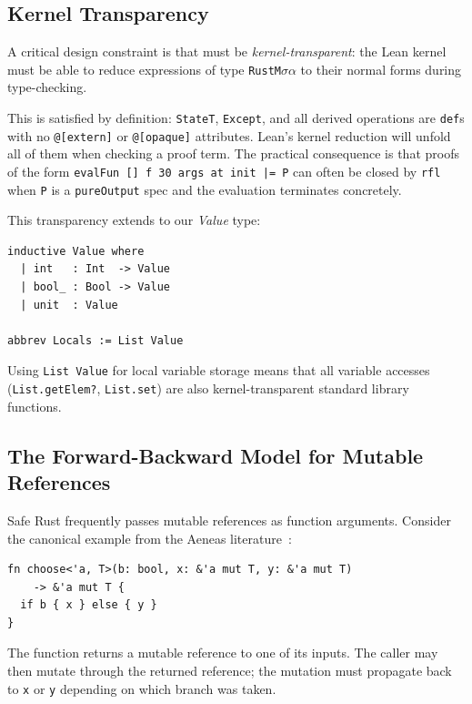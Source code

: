 \subsection{Kernel Transparency}

A critical design constraint is that \RustM must be \emph{kernel-transparent}:
the Lean kernel must be able to reduce expressions of type
\texttt{RustM\;$\sigma$\;$\alpha$} to their normal forms during type-checking.

This is satisfied by definition: \texttt{StateT}, \texttt{Except}, and all
derived operations are \texttt{def}s with no \texttt{@[extern]} or
\texttt{@[opaque]} attributes. Lean's kernel reduction will unfold all of
them when checking a proof term. The practical consequence is that proofs of
the form \texttt{evalFun [] f 30 args at init |= P} can often be closed
by \texttt{rfl} when \texttt{P} is a \texttt{pureOutput} spec and the
evaluation terminates concretely.

This transparency extends to our \emph{Value} type:

\begin{lstlisting}[caption={Value and Locals types.},label={lst:value}]
inductive Value where
  | int   : Int  -> Value
  | bool_ : Bool -> Value
  | unit  : Value

abbrev Locals := List Value
\end{lstlisting}

Using \texttt{List Value} for local variable storage means that all variable
accesses (\texttt{List.getElem?}, \texttt{List.set}) are also kernel-transparent
standard library functions.

\subsection{The Forward-Backward Model for Mutable References}
\label{sec:fbpair}

Safe Rust frequently passes mutable references as function arguments. Consider
the canonical example from the Aeneas literature~\cite{ho2022aeneas}:

\begin{verbatim}
fn choose<'a, T>(b: bool, x: &'a mut T, y: &'a mut T)
    -> &'a mut T {
  if b { x } else { y }
}
\end{verbatim}

The function returns a mutable reference to one of its inputs. The caller
may then mutate through the returned reference; the mutation must propagate
back to \texttt{x} or \texttt{y} depending on which branch was taken.

